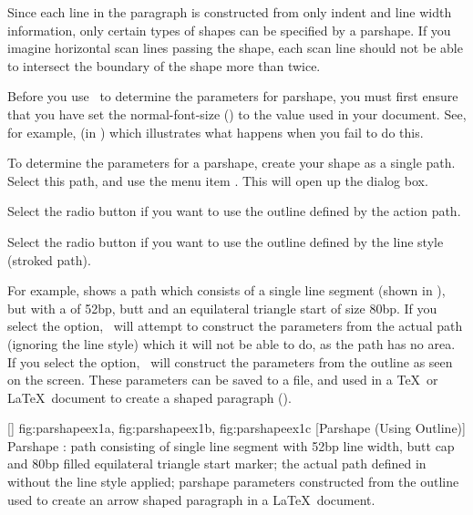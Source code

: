 Since each line in the paragraph is constructed from only indent and
line width information, only certain types of shapes can be
specified by a \gls{parshape}. If you imagine horizontal
scan lines passing  the shape, each scan line should not
be able to intersect the boundary of the shape more than twice.

Before you use \FlowframTk\ to determine the parameters for
\gls{parshape}, you must first ensure that you have set the
\gls{normal-font-size} () to the value
used in your document. See, for example,  (in
) which illustrates what happens when
you fail to do this.


To determine the parameters for a \gls{parshape}, create your shape
as a single \gls{path}. Select this \gls*{path}, and use the menu
item .  This will open up the  dialog box.


Select the  radio button if you want to
use the outline defined by the action \gls{path}.


Select the  radio button if you want to
use the outline defined by the line style (stroked path).

For example,  shows a \gls*{path}
which consists of a single line segment (shown in
), but with a
 of 52\gls{bp}, butt
 and an equilateral triangle
start  of size 80bp.  If you
select the  option, \FlowframTk\
will attempt to construct the parameters from the actual \gls*{path}
(ignoring the line style) which it will not be able to do, as the
\gls*{path} has no area. If you select the
 option, \FlowframTk\ will
construct the parameters from the outline as seen on the screen.
These parameters can be saved to a file, and used in a \TeX\ or
\LaTeX\ document to create a shaped paragraph
().

[\small]
{
  {fig:parshapeex1a}{}{},
  {fig:parshapeex1b}{}{},
  {fig:parshapeex1c}{}{}
}
[Parshape (Using Outline)]
{Parshape :
 path consisting of
single line segment with 52bp line width, butt cap and 80bp filled
equilateral triangle start marker;
 the actual path
defined in  without the line style applied;
\subfigref{fig:parshapeex1c}
\gls{parshape} parameters constructed from the outline
 used to create an arrow shaped paragraph in a \LaTeX\
document.}

